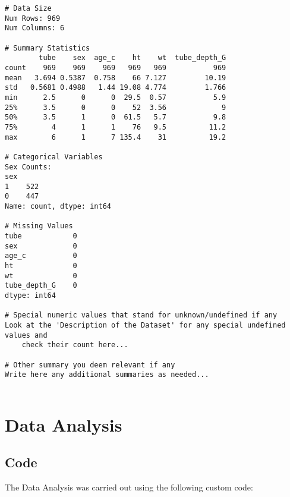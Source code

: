 \documentclass[11pt]{article}
\begin{document}
\begin{Verbatim}[tabsize=4]
# Data Size
Num Rows: 969
Num Columns: 6

# Summary Statistics
        tube    sex  age_c    ht    wt  tube_depth_G
count    969    969    969   969   969           969
mean   3.694 0.5387  0.758    66 7.127         10.19
std   0.5681 0.4988   1.44 19.08 4.774         1.766
min      2.5      0      0  29.5  0.57           5.9
25%      3.5      0      0    52  3.56             9
50%      3.5      1      0  61.5   5.7           9.8
75%        4      1      1    76   9.5          11.2
max        6      1      7 135.4    31          19.2

# Categorical Variables
Sex Counts:
sex
1    522
0    447
Name: count, dtype: int64

# Missing Values
tube            0
sex             0
age_c           0
ht              0
wt              0
tube_depth_G    0
dtype: int64

# Special numeric values that stand for unknown/undefined if any
Look at the 'Description of the Dataset' for any special undefined values and
	check their count here...

# Other summary you deem relevant if any
Write here any additional summaries as needed...


\end{Verbatim}

\section{Data Analysis}
\subsection{{Code}}
The Data Analysis was carried out using the following custom code:
\end{document}
